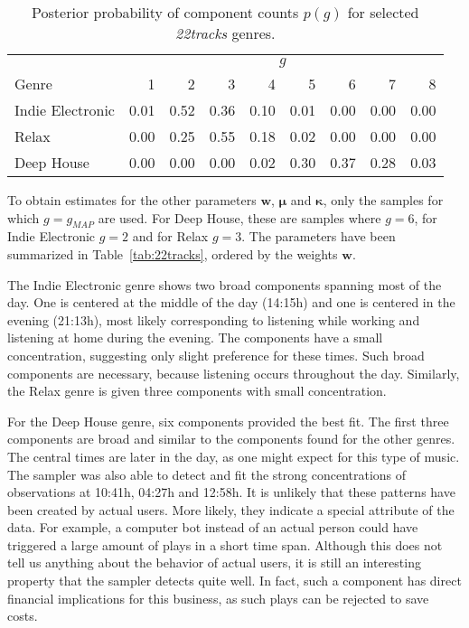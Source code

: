 \begin{table}
	\caption{Posterior probability of component counts $p(g)$ for selected \textit{22tracks} genres.}
	\centering
	\begin{tabular}{lrrrrrrrr}
		\hline
		& \multicolumn{8}{c}{$g$}\\
		Genre & 1 & 2 & 3 & 4 & 5 & 6 & 7 & 8 \\
		\hline
		Indie Electronic & 0.01 & 0.52 & 0.36 & 0.10 & 0.01 & 0.00 & 0.00 & 0.00 \\
		Relax & 0.00 & 0.25 & 0.55 & 0.18 & 0.02 & 0.00 & 0.00 & 0.00 \\
		Deep House & 0.00 & 0.00 & 0.00 & 0.02 & 0.30 & 0.37 & 0.28 & 0.03 \\
		\hline
	\end{tabular}
	\label{tab:posterior-g}
\end{table}


To obtain estimates for the other parameters $\bm w$, $\bm \mu$ and $\bm \kappa$, only the samples for which $g = g_{MAP}$ are used. For Deep House, these are samples where $g=6$, for Indie Electronic $g=2$ and for Relax $g=3$. The parameters have been summarized in Table~\ref{tab:22tracks}, ordered by the weights $\bm w$. 

The Indie Electronic genre shows two broad components spanning most of the day. One is centered at the middle of the day (14:15h) and one is centered in the evening (21:13h), most likely corresponding to listening while working and listening at home during the evening. The components have a small concentration, suggesting only slight preference for these times. Such broad components are necessary, because listening occurs throughout the day. Similarly, the Relax genre is given three components with small concentration. 

For the Deep House genre, six components provided the best fit. The first three components are broad and similar to the components found for the other genres. The central times are later in the day, as one might expect for this type of music. The sampler was also able to detect and fit the strong concentrations of observations at 10:41h, 04:27h and 12:58h. It is unlikely that these patterns have been created by actual users. More likely, they indicate a special attribute of the data. For example, a computer bot instead of an actual person could have triggered a large amount of plays in a short time span. Although this does not tell us anything about the behavior of actual users, it is still an interesting property that the sampler detects quite well. In fact, such a component has direct financial implications for this business, as such plays can be rejected to save costs. 

